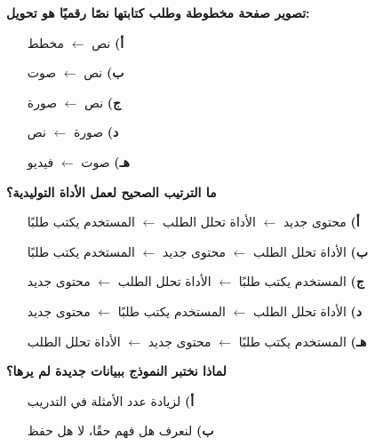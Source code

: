 \documentclass[11pt,a4paper]{article}
\begin{document}
\begin{multicols}{2}
\noindent\begin{minipage}{\linewidth}
\hangindent=0.7cm\textbf{تصوير صفحة مخطوطة وطلب كتابتها نصًا رقميًا هو تحويل:}
\begin{itemize}[leftmargin=0.95cm, labelsep=4pt, itemsep=0pt, topsep=2pt, parsep=0pt]
  \item[\textbf{أ)}] نص $\leftarrow$ مخطط
  \item[\textbf{ب)}] نص $\leftarrow$ صوت
  \item[\textbf{ج)}] نص $\leftarrow$ صورة
  \item[\textbf{د)}] صورة $\leftarrow$ نص
  \item[\textbf{هـ)}] صوت $\leftarrow$ فيديو
\end{itemize}
\end{minipage}\par\vspace{7pt plus 4pt}
\noindent\begin{minipage}{\linewidth}
\hangindent=0.7cm\textbf{ما الترتيب الصحيح لعمل الأداة التوليدية؟}
\begin{itemize}[leftmargin=0.95cm, labelsep=4pt, itemsep=0pt, topsep=2pt, parsep=0pt]
  \item[\textbf{أ)}] محتوى جديد $\leftarrow$ الأداة تحلل الطلب $\leftarrow$ المستخدم يكتب طلبًا
  \item[\textbf{ب)}] الأداة تحلل الطلب $\leftarrow$ محتوى جديد $\leftarrow$ المستخدم يكتب طلبًا
  \item[\textbf{ج)}] المستخدم يكتب طلبًا $\leftarrow$ الأداة تحلل الطلب $\leftarrow$ محتوى جديد
  \item[\textbf{د)}] الأداة تحلل الطلب $\leftarrow$ المستخدم يكتب طلبًا $\leftarrow$ محتوى جديد
  \item[\textbf{هـ)}] المستخدم يكتب طلبًا $\leftarrow$ محتوى جديد $\leftarrow$ الأداة تحلل الطلب
\end{itemize}
\end{minipage}\par\vspace{7pt plus 4pt}
\noindent\begin{minipage}{\linewidth}
\hangindent=0.7cm\textbf{لماذا نختبر النموذج ببيانات جديدة لم يرها؟}
\begin{itemize}[leftmargin=0.95cm, labelsep=4pt, itemsep=0pt, topsep=2pt, parsep=0pt]
  \item[\textbf{أ)}] لزيادة عدد الأمثلة في التدريب
  \item[\textbf{ب)}] لنعرف هل فهم حقًا، لا هل حفظ

\end{itemize}
\end{minipage}
\end{multicols}
\end{document}
